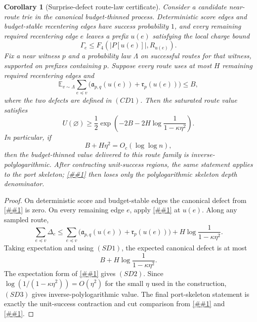 \documentclass[10pt]{article}
\newcommand{\cref}[1]{\ref{##1}}
\newtheorem{corollary}[theorem]{Corollary}
\theoremstyle{definition}
\newcommand{\E}{\mathbb{E}}
\begin{document}
\begin{corollary}[Surprise-defect route-law certificate]
   \label{cor:surprise-defect-route-law}
   Consider a candidate near-route trie in the canonical budget-thinned
   process.  Deterministic score edges and budget-stable recentering edges have
   success probability \(1\), and every remaining required recentering edge
   \(e\) leaves a prefix \(u(e)\) satisfying the local charge bound
   \[
      \Gamma_e\le F_4(|P[u(e)]|,R_{u(e)}).
      \tag{SD0}
   \]
   Fix a near witness \(p\) and a probability law \(\Lambda\) on successful
   routes for that witness, supported on prefixes containing \(p\).  Suppose
   every route uses at most \(H\) remaining required recentering edges and
   \[
      \E_{v\sim\Lambda}
      \sum_{e\preceq v}
      \bigl(
         \mathfrak a_{p,q}(u(e))
         +
         \mathfrak r_p(u(e))
      \bigr)
      \le B ,
      \tag{SD1}
   \]
   where the two defects are defined in \((CD1)\).  Then the saturated route
   value satisfies
   \[
      U(\varnothing)
      \ge
      \frac12
      \exp\!\left(
         -2B
         -2H\log\frac1{1-\kappa\eta^2}
      \right).
      \tag{SD2}
   \]
   In particular, if
   \[
      B+H\eta^2=O_c(\log\log n),
      \tag{SD3}
   \]
   then the budget-thinned value delivered to this route family is
   inverse-polylogarithmic.  After contracting unit-success regions, the same
   statement applies to the port skeleton; \cref{cor:skeleton-cut-conductance}
   then loses only the polylogarithmic skeleton depth denominator.
\end{corollary}

\begin{proof}
   On deterministic score and budget-stable edges the canonical defect from
   \cref{cor:canonical-budget-defect-toll} is zero.  On every remaining edge
   \(e\), apply \cref{lem:canonical-defect-splitting} at \(u(e)\).  Along any
   sampled route,
   \[
      \sum_{e\preceq v}\Delta_e
      \le
      \sum_{e\preceq v}
      \bigl(
         \mathfrak a_{p,q}(u(e))
         +
         \mathfrak r_p(u(e))
      \bigr)
      +
      H\log\frac1{1-\kappa\eta^2}.
   \]
   Taking expectation and using \((SD1)\), the expected canonical defect is at
   most
   \[
      B+H\log\frac1{1-\kappa\eta^2}.
   \]
   The expectation form of \cref{cor:canonical-budget-defect-toll} gives
   \((SD2)\).  Since
   \(\log(1/(1-\kappa\eta^2))=O(\eta^2)\) for the small \(\eta\) used in the
   construction, \((SD3)\) gives inverse-polylogarithmic value.  The final
   port-skeleton statement is exactly the unit-success contraction and cut
   comparison from \cref{lem:port-skeleton-saturated-comparison} and
   \cref{cor:skeleton-cut-conductance}.
\end{proof}
\end{document}
